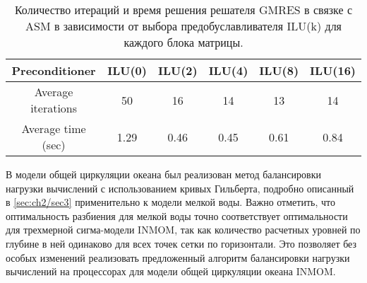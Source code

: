 \bigskip

\begin{table}[htb!]
\caption{Количество итераций и время решения решателя GMRES в связке с ASM в зависимости от выбора предобуславливателя ILU(k) для каждого блока матрицы.}
\begin{tabular}{|c|c|c|c|c|c|}
\hline 
Preconditioner & ILU(0) & ILU(2) & ILU(4) & ILU(8) & ILU(16) \\ 
\hline 
Average iterations & 50 & 16 & 14 & 13 & 14 \\ 
\hline 
Average time (sec) & 1.29 & 0.46 & 0.45 & 0.61 & 0.84 \\ 
\hline 
\end{tabular} 
\end{table}



	В модели общей циркуляции океана был реализован метод балансировки нагрузки вычислений с использованием кривых Гильберта, подробно описанный в \ref{sec:ch2/sec3} применительно к модели мелкой воды. Важно отметить, что оптимальность разбиения для мелкой воды точно соответствует оптимальности для трехмерной сигма-модели INMOM, так как количество расчетных уровней по глубине в ней одинаково для всех точек сетки по горизонтали. Это позволяет без особых изменений реализовать предложенный алгоритм балансировки нагрузки вычислений на процессорах для модели общей циркуляции океана INMOM.

\FloatBarrier
